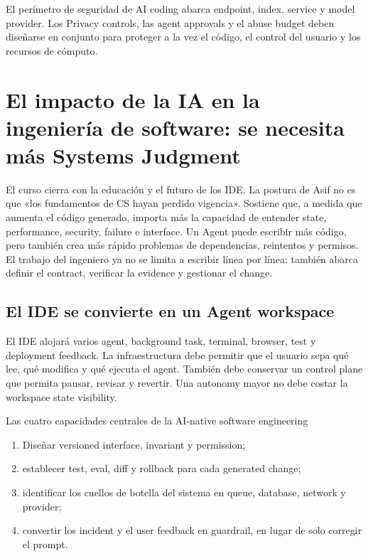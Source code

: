 \documentclass[a4paper]{article}
\begin{document}
El perímetro de seguridad de AI coding abarca endpoint, index, service y model provider. Los Privacy controls, las agent approvals y el abuse budget deben diseñarse en conjunto para proteger a la vez el código, el control del usuario y los recursos de cómputo.
\section{El impacto de la IA en la ingeniería de software: se necesita más Systems Judgment}

El curso cierra con la educación y el futuro de los IDE. La postura de Asif no es que «los fundamentos de CS hayan perdido vigencia». Sostiene que, a medida que aumenta el código generado, importa más la capacidad de entender state, performance, security, failure e interface. Un Agent puede escribir más código, pero también crea más rápido problemas de dependencias, reintentos y permisos. El trabajo del ingeniero ya no se limita a escribir línea por línea: también abarca definir el contract, verificar la evidence y gestionar el change.

\subsection{El IDE se convierte en un Agent workspace}

El IDE alojará varios agent, background task, terminal, browser, test y deployment feedback. La infraestructura debe permitir que el usuario sepa qué lee, qué modifica y qué ejecuta el agent. También debe conservar un control plane que permita pausar, revisar y revertir. Una autonomy mayor no debe costar la workspace state visibility.

\begin{importantbox}{Las cuatro capacidades centrales de la AI-native software engineering}
\begin{enumerate}
  \item Diseñar versioned interface, invariant y permission;
  \item establecer test, eval, diff y rollback para cada generated change;
  \item identificar los cuellos de botella del sistema en queue, database, network y provider;
  \item convertir los incident y el user feedback en guardrail, en lugar de solo corregir el prompt.
\end{enumerate}
\end{importantbox}
\end{document}
